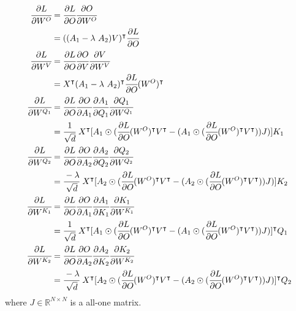 \documentclass{article}
\begin{document}
\begin{equation}
\begin{aligned}
\label{eq:diffgrad}
\cfrac{\partial L}{\partial W^O} &= \cfrac{\partial L}{\partial O} \cfrac{\partial O}{\partial W^O} \\
&= ((A_1 - \lambda~A_2)V)^{\intercal} \cfrac{\partial L}{\partial O} \\
\cfrac{\partial L}{\partial W^V} &= \cfrac{\partial L}{\partial O} \cfrac{\partial O}{\partial V} \cfrac{\partial V}{\partial W^V} \\
&= X^{\intercal} (A_1 - \lambda~A_2)^{\intercal} \cfrac{\partial L}{\partial O} (W^O)^{\intercal} \\
\cfrac{\partial L}{\partial W^{Q_1}} &= \cfrac{\partial L}{\partial O} \cfrac{\partial O}{\partial A_1} \cfrac{\partial A_1}{\partial Q_1} \cfrac{\partial Q_1}{\partial W^{Q_1}} \\
&= \cfrac{1}{\sqrt{d}} ~ X^{\intercal} [A_1 \odot (\cfrac{\partial L}{\partial O} (W^O)^{\intercal} V^{\intercal} - (A_1 \odot (\cfrac{\partial L}{\partial O} (W^O)^{\intercal} V^{\intercal})) J)] K_1 \\
\cfrac{\partial L}{\partial W^{Q_2}} &= \cfrac{\partial L}{\partial O} \cfrac{\partial O}{\partial A_2} \cfrac{\partial A_2}{\partial Q_2} \cfrac{\partial Q_2}{\partial W^{Q_2}} \\
&= \cfrac{-\lambda}{\sqrt{d}} ~ X^{\intercal} [A_2 \odot (\cfrac{\partial L}{\partial O} (W^O)^{\intercal} V^{\intercal} - (A_2 \odot (\cfrac{\partial L}{\partial O} (W^O)^{\intercal} V^{\intercal})) J)] K_2 \\
\cfrac{\partial L}{\partial W^{K_1}} &= \cfrac{\partial L}{\partial O} \cfrac{\partial O}{\partial A_1} \cfrac{\partial A_1}{\partial K_1} \cfrac{\partial K_1}{\partial W^{K_1}} \\
&= \cfrac{1}{\sqrt{d}} ~ X^{\intercal} [A_1 \odot (\cfrac{\partial L}{\partial O} (W^O)^{\intercal} V^{\intercal} - (A_1 \odot (\cfrac{\partial L}{\partial O} (W^O)^{\intercal} V^{\intercal})) J)]^{\intercal} Q_1 \\
\cfrac{\partial L}{\partial W^{K_2}} &= \cfrac{\partial L}{\partial O} \cfrac{\partial O}{\partial A_2} \cfrac{\partial A_2}{\partial K_2} \cfrac{\partial K_2}{\partial W^{K_2}} \\
&= \cfrac{- \lambda}{\sqrt{d}} ~ X^{\intercal} [A_2 \odot (\cfrac{\partial L}{\partial O} (W^O)^{\intercal} V^{\intercal} - (A_2 \odot (\cfrac{\partial L}{\partial O} (W^O)^{\intercal} V^{\intercal})) J)]^{\intercal} Q_2 \\
\end{aligned}    
\end{equation}
where $J \in \mathbb{R}^{N \times N}$ is a all-one matrix.
\end{document}
